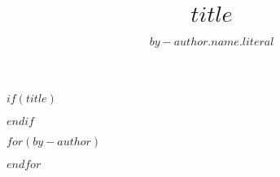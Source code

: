 $if(title)$
  \title{$title$}
$endif$

$for(by-author)$
  \author[ ]{$by-author.name.literal$}
$endfor$

\affil[ ]{}
\date{}
